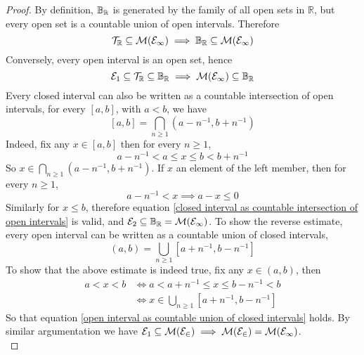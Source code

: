 \documentclass[../../main.tex]{subfiles}
\begin{document}
\begin{proof}
    By definition, $\mathbb{B}_{\mathbb{R}}$ is generated by the family of all open sets in $\mathbb{R}$, but every open set is a countable union of open intervals. Therefore
    \[
    \mathcal{T}_\mathbb{R}\subseteq \cal{M}({\cal{E}}_1) \implies \mathbb{B}_{\mathbb{R}}\subseteq\cal{M}({\cal{E}}_1)
    \]
    Conversely, every open interval is an open set, hence
    \[
    {\cal{E}}_1\subseteq \mathcal{T}_\mathbb{R}\subseteq\mathbb{B}_{\mathbb{R}}\implies\cal{M}({\cal{E}}_1)\subseteq\mathbb{B}_{\mathbb{R}}
    \]
    Every closed interval can also be written as a countable intersection of open intervals, for every $[a,b]$, with $a<b$, we have
    \begin{equation}\label{closed interval as countable intersection of open intervals}
    [a,b] = \bigcap_{n\geq 1}(a-n^{-1},b+n^{-1})
    \end{equation}
    Indeed, fix any $x\in[a,b]$ then for every $n\geq 1$, 
    \[
    a-n^{-1}<a\leq x\leq b<b+n^{-1}
    \]
    So $x\in \bigcap_{n\geq 1} (a-n^{-1},b+n^{-1})$. If $x$ an element of the left member, then for every $n\geq 1$,
    \[
    a-n^{-1}<x\implies a-x\leq 0
    \]
    Similarly for $x\leq b$, therefore equation \eqref{closed interval as countable intersection of open intervals} is valid, and ${\cal{E}}_2\subseteq \mathbb{B}_{\mathbb{R}}=\cal{M}({\cal{E}}_1)$. To show the reverse estimate, every open interval can be written as a countable union of closed intervals,
    \begin{equation}\label{open interval as countable union of closed intervals}
    (a,b)=\bigcup_{n\geq 1}[a+n^{-1},b-n^{-1}]
    \end{equation}
    To show that the above estimate is indeed true, fix any $x\in(a,b)$, then
    \begin{align*}
        a<x<b&\iff a<a+n^{-1}\leq x\leq b-n^{-1}<b\\
        &\iff x\in\bigcup_{n\geq 1}[a+n^{-1},b-n^{-1}]
    \end{align*}
    So that equation \eqref{open interval as countable union of closed intervals} holds. By similar argumentation we have ${\cal{E}}_1\subseteq\cal{M}({\cal{E}}_2)\implies\cal{M}({\cal{E}}_2)=\cal{M}({\cal{E}}_1)$.\\
    

\end{proof}
\end{document}
